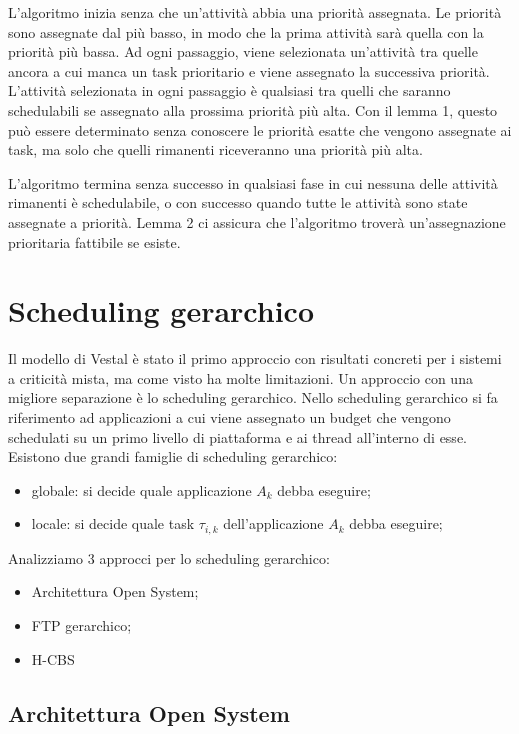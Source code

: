 \documentclass[11pt,a4paper]{report}
\begin{document}
L'algoritmo inizia senza che un'attività abbia una priorità assegnata. Le priorità sono assegnate dal più basso, in modo che la prima attività sarà quella con la priorità più bassa. Ad ogni passaggio, viene selezionata un'attività tra quelle ancora a cui manca un task prioritario e viene assegnato la successiva priorità. L'attività selezionata in ogni passaggio è qualsiasi tra quelli che saranno schedulabili se assegnato alla prossima priorità più alta. Con il lemma 1, questo può essere determinato senza conoscere le priorità esatte che vengono assegnate ai task, ma solo che quelli rimanenti riceveranno una priorità più alta.

L'algoritmo termina senza successo in qualsiasi fase in cui nessuna delle attività rimanenti è schedulabile, o con
successo quando tutte le attività sono state assegnate a priorità.
Lemma 2 ci assicura che l'algoritmo troverà un'assegnazione prioritaria fattibile se esiste.

\section{Scheduling gerarchico}
Il modello di Vestal è stato il primo approccio con risultati concreti per i sistemi a criticità mista, ma come visto ha molte limitazioni. Un approccio con una migliore separazione è lo scheduling gerarchico. Nello scheduling gerarchico si fa riferimento ad applicazioni a cui viene assegnato un budget che vengono schedulati su un primo livello di piattaforma e ai thread all'interno di esse. Esistono due grandi famiglie di scheduling gerarchico:

\begin{itemize}
    \item globale: si decide quale applicazione $A_k$ debba eseguire;
    \item locale: si decide quale task $\tau_{i,k}$ dell'applicazione $A_k$ debba eseguire;
\end{itemize}

Analizziamo 3 approcci per lo scheduling gerarchico:
\begin{itemize}
    \item Architettura Open System;
    \item FTP gerarchico;
    \item H-CBS
\end{itemize}

\subsection{Architettura Open System}
\end{document}
